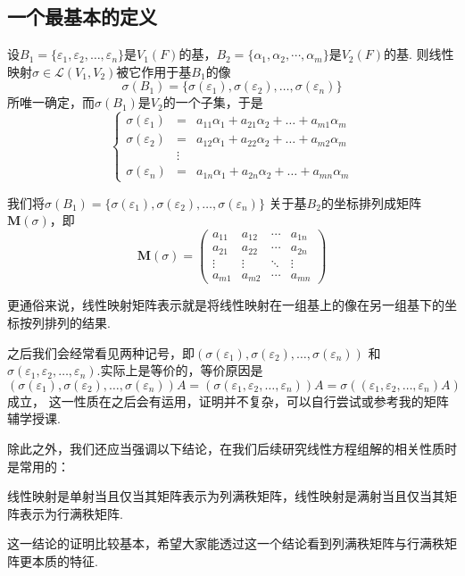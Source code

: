\subsection{一个最基本的定义}
\begin{definition}
    设$B_1=\{\varepsilon_1,\varepsilon_2,\ldots,\varepsilon_n\}$是$V_1(F)$的基，$B_2=\{\alpha_1,\alpha_2,\cdots,\alpha_m\}$是$V_2(F)$的基.
    则线性映射$\sigma \in \mathcal{L}(V_1,V_2)$被它作用于基$B_1$的像
    \[\sigma(B_1)=\{\sigma(\varepsilon_1),\sigma(\varepsilon_2),\ldots,\sigma(\varepsilon_n)\}\]
    所唯一确定，而$\sigma(B_1)$是$V_2$的一个子集，于是
    \[ \left\{
     \begin{array}{rcl}
        \sigma(\varepsilon_1)&=&a_{11}\alpha_1+a_{21}\alpha_2+\ldots+a_{m1}\alpha_m \\
        \sigma(\varepsilon_2)&=&a_{12}\alpha_1+a_{22}\alpha_2+\ldots+a_{m2}\alpha_m \\
        &\vdots& \\
        \sigma(\varepsilon_n)&=&a_{1n}\alpha_1+a_{2n}\alpha_2+\ldots+a_{mn}\alpha_m
     \end{array}
    \right. \]

    我们将$\sigma(B_1)=\{\sigma(\varepsilon_1),\sigma(\varepsilon_2),\ldots,\sigma(\varepsilon_n)\}$
    关于基$B_2$的坐标排列成矩阵$\mathbf{M}(\sigma)$，即
    \[\mathbf{M}(\sigma)=\begin{pmatrix}
        a_{11} & a_{12} & \cdots & a_{1n} \\
        a_{21} & a_{22} & \cdots & a_{2n} \\
        \vdots & \vdots & \ddots & \vdots \\
        a_{m1} & a_{m2} & \cdots & a_{mn}
    \end{pmatrix}\]
\end{definition}
更通俗来说，线性映射矩阵表示就是将线性映射在一组基上的像在另一组基下的坐标按列排列的结果.

之后我们会经常看见两种记号，即$(\sigma(\varepsilon_1),\sigma(\varepsilon_2),\ldots,\sigma(\varepsilon_n))$
和$\sigma(\varepsilon_1,\varepsilon_2,\ldots,\varepsilon_n)$.实际上是等价的，等价原因是
$(\sigma(\varepsilon_1),\sigma(\varepsilon_2),\ldots,\sigma(\varepsilon_n))A=(\sigma(\varepsilon_1,\varepsilon_2,\ldots,\varepsilon_n))A=\sigma((\varepsilon_1,\varepsilon_2,\ldots,\varepsilon_n)A)$成立，
这一性质在之后会有运用，证明并不复杂，可以自行尝试或参考我的矩阵辅学授课.

除此之外，我们还应当强调以下结论，在我们后续研究线性方程组解的相关性质时是常用的：
\begin{theorem}
    线性映射是单射当且仅当其矩阵表示为列满秩矩阵，线性映射是满射当且仅当其矩阵表示为行满秩矩阵.
\end{theorem}
这一结论的证明比较基本，希望大家能透过这一个结论看到列满秩矩阵与行满秩矩阵更本质的特征.
